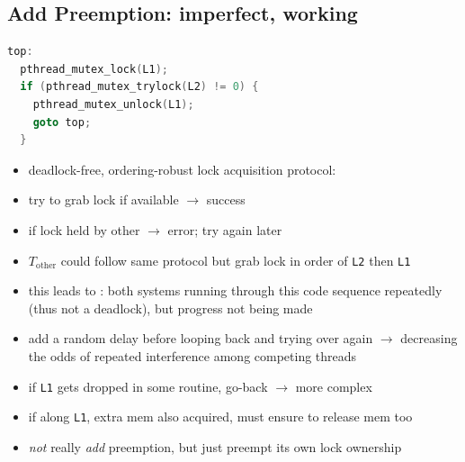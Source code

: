 \documentclass[8pt,a4paper,landscape]{extarticle}
\begin{document}
\begin{multicols*}{3}
\begin{minipage}{0.56\linewidth}
\section*{Add Preemption: imperfect, working}
\begin{lstlisting}[language=c,xleftmargin=2pt]
top:
  pthread_mutex_lock(L1);
  if (pthread_mutex_trylock(L2) != 0) {
    pthread_mutex_unlock(L1);
    goto top;
  }
\end{lstlisting}
\end{minipage}
\begin{minipage}{0.44\linewidth}
  \flushleft
  \begin{itemize}
  \item deadlock-free, ordering-robust lock acquisition protocol:
  \item try to grab lock if available $\to$ success
  \item if lock held by other $\to$ error; try again later
  \end{itemize}
\end{minipage}
\begin{itemize}
\item $T_{\text{other}}$ could follow same protocol but grab lock in order of \texttt{L2} then \texttt{L1}
\item this leads to : both systems running through this code sequence repeatedly (thus not a deadlock), but progress not being made
\item add a random delay before looping back and trying over again $\to$ decreasing the odds of repeated interference among competing threads
\item[1.] if \texttt{L1} gets dropped in some routine, go-back $\to$ more complex
\item[2.] if along \texttt{L1}, extra mem also acquired, must ensure to release mem too
\item[3.] \emph{not} really \emph{add} preemption, but just preempt its own lock ownership
\end{itemize}

\end{multicols*}
\end{document}
